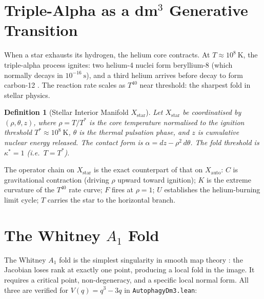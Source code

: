 \documentclass[12pt,a4paper]{article}
\newtheorem{definition}{Definition}[section]
\begin{document}
\section{Triple-Alpha as a dm$^3$ Generative Transition}
\label{sec:star}

When a star exhausts its hydrogen, the helium core contracts.
At $T \approx 10^8~\mathrm{K}$, the triple-alpha process ignites:
two helium-4 nuclei form beryllium-8 (which normally decays in
$10^{-16}~\mathrm{s}$), and a third helium arrives before decay to
form carbon-12 \cite{Salpeter1952}.
The reaction rate scales as $T^{40}$ near threshold: the sharpest fold
in stellar physics.

\begin{definition}[Stellar Interior Manifold $X_\mathrm{star}$]
\label{def:xstar}
Let $X_\mathrm{star}$ be coordinatised by $(\rho, \theta, z)$, where
$\rho = T/T^*$ is the core temperature normalised to the ignition
threshold $T^* \approx 10^8~\mathrm{K}$, $\theta$ is the thermal
pulsation phase, and $z$ is cumulative nuclear energy released.
The contact form is $\alpha = dz - \rho^2\,d\theta$.
The fold threshold is $\kappa^* = 1$ (i.e.\ $T = T^*$).
\end{definition}

The operator chain on $X_\mathrm{star}$ is the exact counterpart of
that on $X_\mathrm{auto}$: $C$ is gravitational contraction
(driving $\rho$ upward toward ignition); $K$ is the extreme curvature
of the $T^{40}$ rate curve; $F$ fires at $\rho = 1$; $U$ establishes
the helium-burning limit cycle; $T$ carries the star to the horizontal
branch.

\section{The Whitney $A_1$ Fold}
\label{sec:whitney}

The Whitney $A_1$ fold is the simplest singularity in smooth map
theory \cite{Arnold1986}: the Jacobian loses rank at exactly one point,
producing a local fold in the image.
It requires a critical point, non-degeneracy, and a specific local
normal form.
All three are verified for $V(q) = q^3 - 3q$ in
\texttt{AutophagyDm3.lean}:
\end{document}
